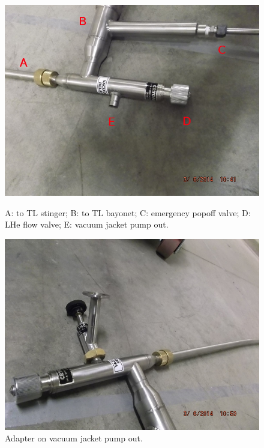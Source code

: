 \begin{figure}[!htbp]
 \centering
  \begin{minipage}{.45\textwidth}
 \includegraphics[width=\textwidth]{./img/cf-tl-pumpout.JPG}
 \caption{A: to TL stinger; B: to TL bayonet; C: emergency popoff valve; D: LHe flow valve; E: vacuum jacket pump out.}
 \label{fig:cf-tl-pumpout}
 \end{minipage}
 \quad
 \begin{minipage}{.45\textwidth}
 \includegraphics[width=\textwidth]{./img/cf-adapter-on-tl.JPG}
 \caption{Adapter on vacuum jacket pump out.}

\end{minipage}
\end{figure}
